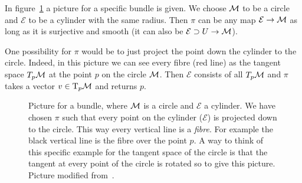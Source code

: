 \documentclass[11pt, a4paper, twocolumn]{article} %
\begin{document}
\begin{note}
In figure~\ref{fig:circletangentbundle} a picture for a specific bundle is given.
We choose $\mathcal{M}$ to be a circle and $\mathcal{E}$ to be a cylinder with the same radius.
Then $\pi$ can be any map $\mathcal{E}\to\mathcal{M}$ as long as it is surjective and smooth (it can also be $\mathcal{E}\supset U \to \mathcal{M}$).

One possibility for $\pi$ would be to just project the point down the cylinder to the circle.
Indeed, in this picture we can see every fibre (red line) as the tangent space $T_p\mathcal{M}$ at the point
$p$ on the circle $\mathcal{M}$. Then $\mathcal{E}$ consists of all $T_p\mathcal{M}$ and $\pi$ takes a vector $v\in \T_p\M$
and returns $p$.
\end{note}


\begin{figure}[tbh]
    \centering
    \caption{Picture for a bundle, where $\mathcal{M}$ is a circle and $\mathcal{E}$ a cylinder.
        We have chosen $\pi$ such that every point on the cylinder ($\mathcal{E}$) is projected
        down to the circle. This way every vertical line is a \textit{fibre}.
        For example the black vertical line is the fibre over the point $p$. 
        A way to think of this specific example for the tangent space of the
        circle is that the tangent at every point of the circle is rotated so
        to give this picture. 
        Picture modified from~\cite{texstackexchange:tangentbundlecircle}.}
    \label{fig:circletangentbundle}
\end{figure}
\end{document}
